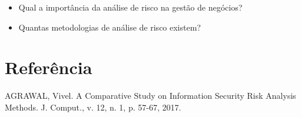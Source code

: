 \documentclass{report}
\newcommand{\cmark}{\ding{51}}
\newcommand{\done}{\rlap{$\square$}{\raisebox{2pt}{\large\hspace{1pt}\cmark}}
\hspace{-2.5pt}}
\begin{document}
\begin{itemize}
    \item Qual a importância da análise de risco na gestão de negócios?
\end{itemize}
\begin{itemize}
    \item Quantas metodologias de análise de risco existem?
\end{itemize}
\section*{Referência}
AGRAWAL, Vivel. A Comparative Study on Information Security Risk Analysis Methods. J. Comput., v. 12, n. 1, p. 57-67, 2017.
\end{document}

